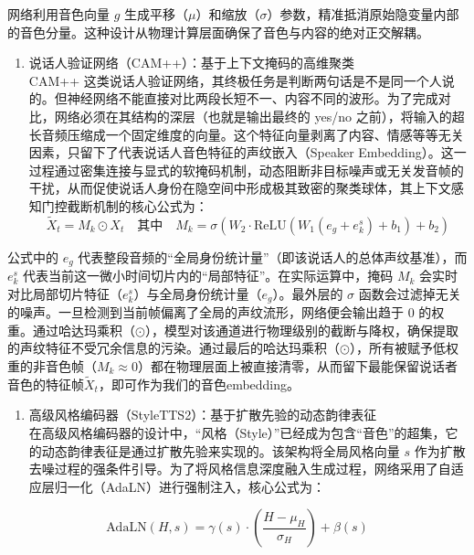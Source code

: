 网络利用音色向量 \(g\)
生成平移（\(\mu\)）和缩放（\(\sigma\)）参数，精准抵消原始隐变量内部的音色分量。这种设计从物理计算层面确保了音色与内容的绝对正交解耦。

\begin{enumerate}
\def\labelenumi{(\arabic{enumi})}
\setcounter{enumi}{1}
\item
  说话人验证网络（CAM++）：基于上下文掩码的高维聚类\\
  CAM++
  这类说话人验证网络，其终极任务是判断两句话是不是同一个人说的。但神经网络不能直接对比两段长短不一、内容不同的波形。为了完成对比，网络必须在其结构的深层（也就是输出最终的
  yes/no
  之前），将输入的超长音频压缩成一个固定维度的向量。这个特征向量剥离了内容、情感等等无关因素，只留下了代表说话人音色特征的声纹嵌入（Speaker
  Embedding）。这一过程通过密集连接与显式的软掩码机制，动态阻断非目标噪声或无关发音帧的干扰，从而促使说话人身份在隐空间中形成极其致密的聚类球体，其上下文感知门控截断机制的核心公式为：\\
  \[{\widetilde{X}}_{t} = M_{k} \odot X_{t}\quad\text{其中}\quad M_{k} = \sigma\left( W_{2} \cdot \text{ReLU}\left( W_{1}(e_{g} + e_{k}^{s}) + b_{1} \right) + b_{2} \right)\]
\end{enumerate}

公式中的 \(e_{g}\)
代表整段音频的``全局身份统计量''（即该说话人的总体声纹基准），而
\(e_{k}^{s}\)
代表当前这一微小时间切片内的``局部特征''。在实际运算中，掩码 \(M_{k}\)
会实时对比局部切片特征（\(e_{k}^{s}\)）与全局身份统计量（\(e_{g}\)）。最外层的
\(\sigma\)
函数会过滤掉无关的噪声。一旦检测到当前帧偏离了全局的声纹流形，网络便会输出趋于
0
的权重。通过哈达玛乘积（\(\odot\)），模型对该通道进行物理级别的截断与降权，确保提取的声纹特征不受冗余信息的污染。通过最后的哈达玛乘积（\(\odot\)），所有被赋予低权重的非音色帧（\(M_{k} \approx 0\)）都在物理层面上被直接清零，从而留下最能保留说话者音色的特征帧\({\widetilde{X}}_{t}\)，即可作为我们的音色embedding。

\begin{enumerate}
\def\labelenumi{(\arabic{enumi})}
\setcounter{enumi}{2}
\item
  高级风格编码器（StyleTTS2）：基于扩散先验的动态韵律表征\\
  在高级风格编码器的设计中，``风格（Style）''已经成为包含``音色''的超集，它的动态韵律表征是通过扩散先验来实现的。该架构将全局风格向量
  \(s\)
  作为扩散去噪过程的强条件引导。为了将风格信息深度融入生成过程，网络采用了自适应层归一化（AdaLN）进行强制注入，核心公式为：
\end{enumerate}

\[\text{AdaLN}(H,s) = \gamma(s) \cdot \left( \frac{H - \mu_{H}}{\sigma_{H}} \right) + \beta(s)\]

